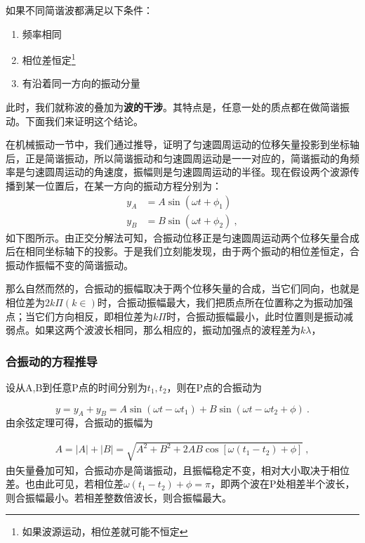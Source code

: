 如果不同简谐波都满足以下条件：
\begin{enumerate}
\item 频率相同
\item 相位差恒定\footnote{如果波源运动，相位差就可能不恒定}
\item 有沿着同一方向的振动分量
\end{enumerate}
此时，我们就称波的叠加为\textbf{波的干涉}。其特点是，任意一处的质点都在做简谐振动。下面我们来证明这个结论。



在机械振动一节中，我们通过推导，证明了匀速圆周运动的位移矢量投影到坐标轴后，正是简谐振动，所以简谐振动和匀速圆周运动是一一对应的，简谐振动的角频率是匀速圆周运动的角速度，振幅则是匀速圆周运动的半径。现在假设两个波源传播到某一位置后，在某一方向的振动方程分别为：
\begin{equation}
\begin{aligned}
y_A&=A\sin(\omega t+\phi_1)\\
y_B&=B\sin (\omega t+\phi_2)~,
\end{aligned}
\end{equation}
如下图所示。由正交分解法可知，合振动位移正是匀速圆周运动两个位移矢量合成后在相同坐标轴下的投影。于是我们立刻能发现，由于两个振动的相位差恒定，合振动作振幅不变的简谐振动。

那么自然而然的，合振动的振幅取决于两个位移矢量的合成，当它们同向，也就是相位差为$2k\Pi(k\in )$时，合振动振幅最大，我们把质点所在位置称之为振动加强点；当它们方向相反，即相位差为$k\Pi$时，合振动振幅最小，此时位置则是振动减弱点。如果这两个波波长相同，那么相应的，振动加强点的波程差为$k\lambda$，
\subsubsection{合振动的方程推导}


设从A,B到任意P点的时间分别为$t_1,t_2$，则在P点的合振动为

\begin{equation}
y=y_A+y_B=A\sin(\omega t-\omega t_1)+B\sin(\omega t-\omega t_2+\phi)~.
\end{equation}
由余弦定理可得，合振动的振幅为

\begin{equation}
\begin{aligned}
A=|A|+|B|=\sqrt{A^2+B^2+2AB\cos[\omega(t_1-t_2)+\phi]}~,
\end{aligned}
\end{equation}
由矢量叠加可知，合振动亦是简谐振动，且振幅稳定不变，相对大小取决于相位差。也由此可见，若相位差$\omega(t_1-t_2)+\phi=\pi$，即两个波在P处相差半个波长，则合振幅最小。若相差整数倍波长，则合振幅最大。